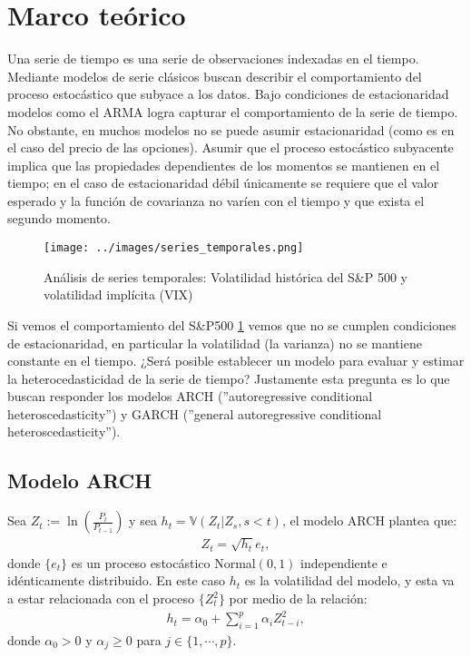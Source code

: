 \section{Marco teórico}

Una serie de tiempo es una serie de observaciones indexadas en el tiempo. Mediante modelos de serie clásicos buscan describir el comportamiento del proceso estocástico que subyace a los datos. Bajo condiciones de estacionaridad modelos como el ARMA logra capturar el comportamiento de la serie de tiempo. No obstante, en muchos modelos no se puede asumir estacionaridad (como es en el caso del precio de las opciones). Asumir que el proceso estocástico subyacente implica que las propiedades dependientes de los momentos se mantienen en el tiempo; en el caso de estacionaridad débil únicamente se requiere que el valor esperado y la función de covarianza no varíen con el tiempo y que exista el segundo momento.
\newline

\begin{figure}[hbt!]
    \centering
    \texttt{[image: ../images/series\_temporales.png]}
    \caption{Análisis de series temporales: Volatilidad histórica del S\&P 500 y volatilidad
  implícita (VIX)}
        \label{fig:series_temporales}   
\end{figure}

Si vemos el comportamiento del S\&P500 \ref{fig:series_temporales} vemos que no se cumplen condiciones de estacionaridad, en particular la volatilidad (la varianza) no se mantiene constante en el tiempo. ¿Será posible establecer un modelo para evaluar y estimar la heterocedasticidad de la serie de tiempo? Justamente esta pregunta es lo que buscan responder los modelos ARCH (''autoregressive conditional heteroscedasticity'') y GARCH (''general autoregressive conditional heteroscedasticity''). 
\newline 
\subsection{Modelo ARCH}
Sea $Z_t:= \ln\left(\frac{P_t}{P_{t-1}}\right)$ y sea $h_t= \mathbb{V}\left(Z_t|Z_s,s<t\right)$, el modelo ARCH plantea que: 
\begin{align*}
    Z_t = \sqrt{h_t} e_{t},
\end{align*}
donde $\{e_t\}$ es un proceso estocástico Normal$(0,1)$ independiente e idénticamente distribuido. En este caso $h_t$ es la volatilidad del modelo, y esta va a estar relacionada con el proceso $\{Z_t^2\}$ por medio de la relación: 
\begin{align*}
    h_t = \alpha_0 + \sum_{i=1}^{p} \alpha_i Z_{t-i}^2,
\end{align*}
donde $\alpha_0>0$ y $\alpha_j\geq 0$ para $j\in \{1,\cdots,p\}$.
